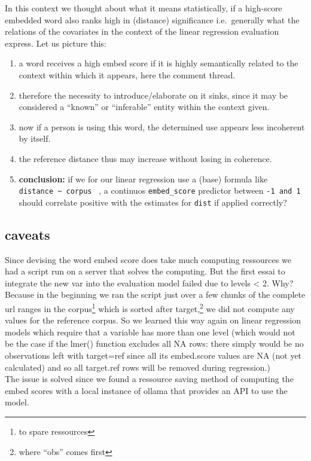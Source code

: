\documentclass[
  12pt,
  oneside]{book}
\providecommand{\tightlist}{%
  \setlength{\itemsep}{0pt}\setlength{\parskip}{0pt}}
\begin{document}
In this context we thought about what it means statistically, if a high-score embedded word also ranks high in (distance) significance i.e.~generally what the relations of the covariates in the context of the linear regression evaluation express. Let us picture this:

\begin{enumerate}
\def\labelenumi{\arabic{enumi}.}
\tightlist
\item
  a word receives a high embed score if it is highly semantically related to the context within which it appears, here the comment thread.
\item
  therefore the necessity to introduce/elaborate on it sinks, since it may be considered a ``known'' or ``inferable'' entity within the context given.
\item
  now if a person is using this word, the determined use appears less incoherent by itself.
\item
  the reference distance thus may increase without losing in coherence.
\item
  \textbf{conclusion:} if we for our linear regression use a (base) formula like \texttt{distance\ \textasciitilde{}\ corpus~} , a continuos \texttt{embed\_score} predictor between \texttt{-1\ and\ 1} should correlate positive with the estimates for \texttt{dist} if applied correctly?
\end{enumerate}

\subsection{caveats}\label{caveats}

Since devising the word embed score does take much computing ressources we had a script run on a server that solves the computing. But the first essai to integrate the new var into the evaluation model failed due to levels \textless{} 2. Why? Because in the beginning we ran the script just over a few chunks of the complete url ranges in the corpus\footnote{to spare ressources} which is sorted after target,\footnote{where ``obs'' comes first} we did not compute any values for the reference corpus. So we learned this way again on linear regression models which require that a variable has more than one level (which would not be the case if the lmer() function excludes all NA rows: there simply would be no observations left with target=ref since all its embed.score values are NA (not yet calculated) and so all target.ref rows will be removed during regression.)\\
The issue is solved since we found a ressource saving method of computing the embed scores with a local instance of ollama that provides an API to use the model.
\end{document}
